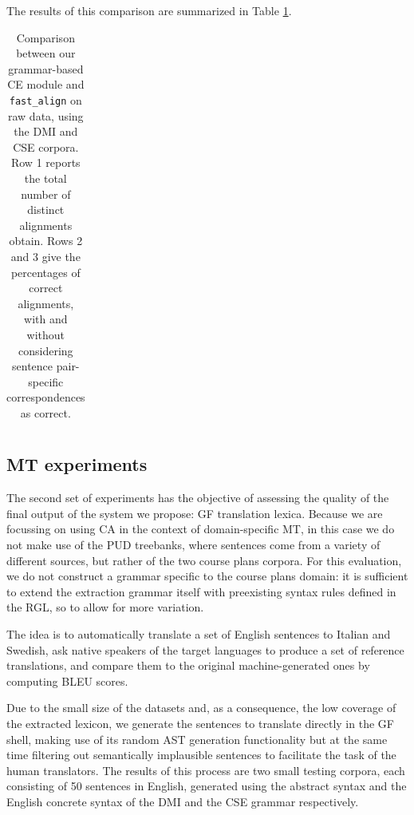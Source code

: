 \documentclass[11pt]{article}
\begin{document}
The results of this comparison are summarized in Table \ref{raw_fast}.

\begin{table}[h]
  \centering
  \small
  \begin{tabular}{l|lll}

  \end{tabular}
  \caption[Comparison between our grammar-based CE module and \texttt{fast\_align}]{Comparison between our grammar-based CE module and \texttt{fast\_align} on raw data, using the DMI and CSE corpora. Row 1 reports the total number of distinct alignments obtain. Rows 2 and 3 give the percentages of correct alignments, with and without considering sentence pair-specific correspondences as correct.}
  \label{raw_fast}
 \end{table}


\subsection{MT experiments}
The second set of experiments has the objective of assessing the quality of the final output of the system we propose: GF translation lexica. 
Because we are focussing on using CA in the context of domain-specific MT, in this case we do not make use of the PUD treebanks, where sentences come from a variety of different sources, but rather of the two course plans corpora. 
For this evaluation, we do not construct a grammar specific to the course plans domain: it is sufficient to extend the extraction grammar itself with preexisting syntax rules defined in the RGL, so to allow for more variation. 

The idea is to automatically translate a set of English sentences to Italian and Swedish, ask native speakers of the target languages to produce a set of reference translations, and compare them to the original machine-generated ones by computing BLEU scores.

Due to the small size of the datasets and, as a consequence, the low coverage of the extracted lexicon, we generate the sentences to translate directly in the GF shell, making use of its random AST generation functionality but at the same time filtering out semantically implausible sentences to facilitate the task of the human translators.
The results of this process are two small testing corpora, each consisting of 50 sentences in English, generated using the abstract syntax and the English concrete syntax of the DMI and the CSE grammar respectively. 
\end{document}
